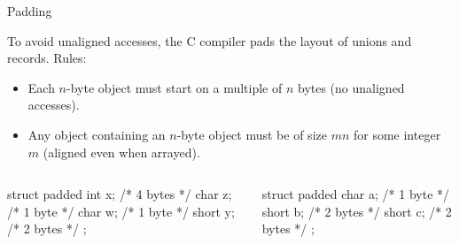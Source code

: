 \documentclass{plt}
\begin{document}
\begin{frame}[fragile]{Padding}
\small

To avoid unaligned accesses, the C compiler pads the layout of unions
and records. Rules:

\begin{itemize}
  \item Each $n$-byte object must start on a multiple of $n$ bytes (no
    unaligned accesses).

   \item Any object containing an $n$-byte object must be of size $mn$ for some
     integer $m$ (aligned even when arrayed).
\end{itemize}

\begin{columns}
\begin{column}[t]{0.5\textwidth}
\begin{C}
struct padded {
  int x;   /* 4 bytes */
  char z;  /* 1 byte  */
  char w;  /* 1 byte  */
  short y; /* 2 bytes */
};
\end{C}

  \end{column}
  \begin{column}[t]{0.5\textwidth}
\begin{C}
struct padded {
  char a;  /* 1 byte  */
  short b; /* 2 bytes */
  short c; /* 2 bytes */
};
\end{C}

  \end{column}
\end{columns}

\end{frame}
\end{document}
